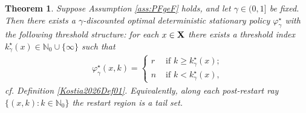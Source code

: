 \documentclass[letterpaper,10pt,conference]{ieeeconf}  %
\newtheorem{theorem}{Theorem}
\begin{document}
\medskip
\begin{theorem}
\label{thm:elapsed_time_threshold}
Suppose {Assumption \ref{ass:PFgeF} holds}, {and let $\gamma\in(0,1]$ be fixed.}
Then there exists a {$\gamma$-discounted} optimal deterministic stationary policy {$\varphi_\gamma^\star$} 
with the following {threshold} structure:
for each $x\in {\bf X}$ there exists a threshold index ${k^\star_\gamma}(x)\in \mathbb N_0\cup\{\infty\}$ 
such that { \begin{align}\label{Kostia2026Eqn08}
\varphi^\star_\gamma(x,k)=\begin{cases}
r & \mbox{ if $k\ge k^{\star}_\gamma(x)$;}\\
n & \mbox{ if $k<k^{\star}_\gamma(x)$,} 
\end{cases}
\end{align}
cf. Definition \ref{Kostia2026Def01}.} 
Equivalently, along each post-restart ray $\{(x,k):k\in\mathbb N_0\}$ the restart region is a tail set.
\end{theorem}
\end{document}
